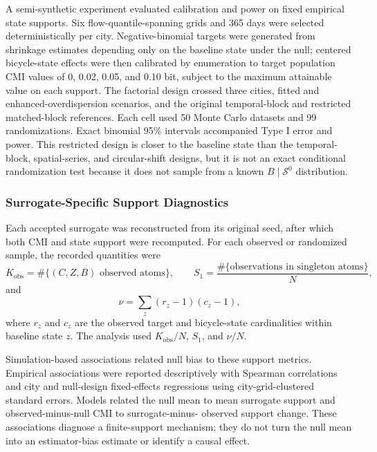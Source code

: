 \documentclass[applsci,article,accept,moreauthors]{Definitions/mdpi}
\begin{document}
A semi-synthetic experiment evaluated calibration and power on fixed
empirical state supports. Six flow-quantile-spanning grids and 365 days
were selected deterministically per city. Negative-binomial targets were
generated from shrinkage estimates depending only on the baseline state
under the null; centered bicycle-state effects were then calibrated by
enumeration to target population CMI values of 0, 0.02, 0.05, and 0.10
bit, subject to the maximum attainable value on each support. The factorial
design crossed three cities, fitted and enhanced-overdispersion scenarios,
and the original temporal-block and restricted matched-block references.
Each cell used 50 Monte Carlo datasets and 99 randomizations. Exact
binomial 95\% intervals accompanied Type I error and power. This restricted
design is closer to the baseline state than the temporal-block, spatial-series,
and circular-shift designs, but it is not an exact
conditional randomization test because it does not sample from a known
\(B\mid\mathcal S^0\) distribution.

\subsubsection{Surrogate-Specific Support Diagnostics}
\label{subsec:e13_support_methods}

Each accepted surrogate was reconstructed from its original seed, after which
both CMI and state support were recomputed. For each observed or randomized
sample, the recorded quantities were
\begin{equation}
K_{\mathrm{obs}}
=\#\{(C,Z,B)\text{ observed atoms}\},
\qquad
S_1
=\frac{\#\{\text{observations in singleton atoms}\}}{N},
\label{eq:e13_support_metrics}
\end{equation}
and
\begin{equation}
\nu=\sum_z(r_z-1)(c_z-1),
\label{eq:e13_effective_df}
\end{equation}
where \(r_z\) and \(c_z\) are the observed target and bicycle-state
cardinalities within baseline state \(z\). The analysis used
\(K_{\mathrm{obs}}/N\), \(S_1\), and \(\nu/N\).

Simulation-based associations related null bias to these support
metrics. Empirical associations were reported descriptively with
Spearman correlations and city and null-design fixed-effects regressions
using city-grid-clustered standard errors. Models related the null mean to
mean surrogate support and observed-minus-null CMI to surrogate-minus-
observed support change. These associations diagnose a finite-support
mechanism; they do not turn the null mean into an estimator-bias estimate or
identify a causal effect.
\end{document}
